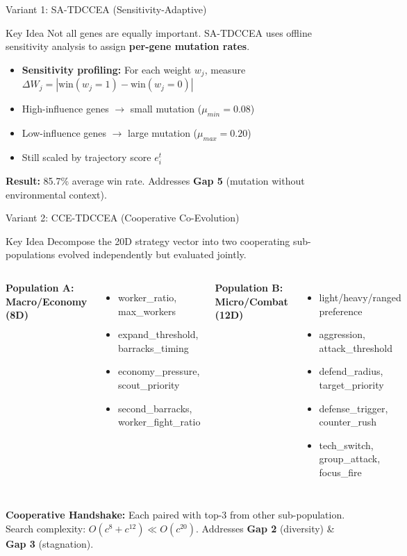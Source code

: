 \documentclass[aspectratio=169, 10pt]{beamer}
\begin{document}
\begin{frame}{Variant 1: SA-TDCCEA (Sensitivity-Adaptive)}
\begin{block}{Key Idea}
Not all genes are equally important. SA-TDCCEA uses offline sensitivity analysis to assign \textbf{per-gene mutation rates}.
\end{block}
\vspace{0.15cm}
\begin{itemize}
    \item \textbf{Sensitivity profiling:} For each weight $w_j$, measure $\Delta W_j = |\text{win}(w_j{=}1) - \text{win}(w_j{=}0)|$
    \item High-influence genes $\rightarrow$ small mutation ($\mu_{min}=0.08$)
    \item Low-influence genes $\rightarrow$ large mutation ($\mu_{max}=0.20$)
    \item Still scaled by trajectory score $e_i^t$
\end{itemize}
\vspace{0.15cm}
\textbf{Result:} 85.7\% average win rate. Addresses \textbf{Gap 5} (mutation without environmental context).
\end{frame}

\begin{frame}{Variant 2: CCE-TDCCEA (Cooperative Co-Evolution)}
\begin{block}{Key Idea}
Decompose the 20D strategy vector into two cooperating sub-populations evolved independently but evaluated jointly.
\end{block}
\vspace{0.15cm}
\begin{columns}[t]
    \textbf{Population A: Macro/Economy (8D)}
    \begin{itemize}\small
        \item worker\_ratio, max\_workers
        \item expand\_threshold, barracks\_timing
        \item economy\_pressure, scout\_priority
        \item second\_barracks, worker\_fight\_ratio
    \end{itemize}
    \textbf{Population B: Micro/Combat (12D)}
    \begin{itemize}\small
        \item light/heavy/ranged preference
        \item aggression, attack\_threshold
        \item defend\_radius, target\_priority
        \item defense\_trigger, counter\_rush
        \item tech\_switch, group\_attack, focus\_fire
    \end{itemize}
\end{columns}
\vspace{0.15cm}
\textbf{Cooperative Handshake:} Each paired with top-3 from other sub-population.\\
Search complexity: $O(c^8 + c^{12}) \ll O(c^{20})$. Addresses \textbf{Gap 2} (diversity) \& \textbf{Gap 3} (stagnation).
\end{frame}
\end{document}
